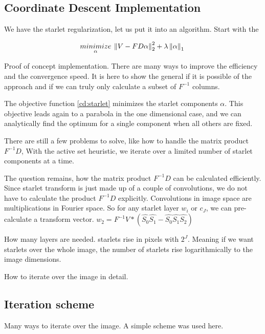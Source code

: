 \subsection{Coordinate Descent Implementation}
We have the starlet regularization, let us put it into an algorithm. Start with the 

\begin{equation}\label{cd:starlet}
\underset{\alpha}{minimize} \: \left \| V - FD\alpha \right \|_2^2 + \lambda \left \| \alpha \right \|_1 \\
\end{equation}

Proof of concept implementation. There are many ways to improve the efficiency and the convergence speed. It is here to show  the general if it is possible of the approach and if we can truly only calculate a subset of $F^{-1}$ columns.

The objective function \eqref{cd:starlet} minimizes the starlet components $\alpha$. This objective leads again to a parabola in the one dimensional case, and we can analytically find the optimum for a single component when all others are fixed. 



There are still a few problems to solve, like how to handle the matrix product $F^{-1}D$, 
With the active set heuristic, we iterate over a limited number of starlet components at a time. 

The question remains, how the matrix product $F^{-1}D$ can be calculated efficiently. Since starlet transform is just made up of a couple of convolutions, we do not have to calculate the product $F^{-1}D$ explicitly. Convolutions in image space are multiplications in Fourier space. 
So for any starlet layer $w_i$ or $c_J$, we can pre-calculate a transform vector. 
$w_2 = F^{-1}V * (\hat{S_0}\hat{S_1} - \hat{S_0}\hat{S_1}\hat{S_2})$

How many layers are needed. starlets rise in pixels with $2^J$. Meaning if we want starlets over the whole image, the number of starlets rise logarithmically to the image dimensions.

How to iterate over the image in detail.



\subsection{Iteration scheme}
Many ways to iterate over the image. A simple scheme was used here. 

